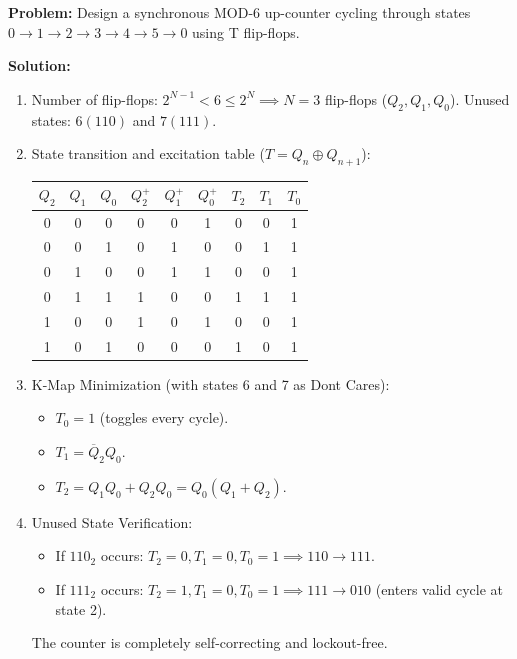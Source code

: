 \begin{examplebox}
\textbf{Problem:} Design a synchronous MOD-6 up-counter cycling through states $0 \to 1 \to 2 \to 3 \to 4 \to 5 \to 0$ using T flip-flops.

\textbf{Solution:}
\begin{enumerate}
    \item Number of flip-flops: $2^{N-1} < 6 \le 2^N \implies N = 3$ flip-flops ($Q_2, Q_1, Q_0$). Unused states: $6 (110)$ and $7 (111)$.
    \item State transition and excitation table ($T = Q_n \oplus Q_{n+1}$):
    \begin{center}
    \begin{tabular}{c c c | c c c | c c c}
    \toprule
    $Q_2$ & $Q_1$ & $Q_0$ & $Q_2^+$ & $Q_1^+$ & $Q_0^+$ & $T_2$ & $T_1$ & $T_0$ \\
    \midrule
    0 & 0 & 0 & 0 & 0 & 1 & 0 & 0 & 1 \\
    0 & 0 & 1 & 0 & 1 & 0 & 0 & 1 & 1 \\
    0 & 1 & 0 & 0 & 1 & 1 & 0 & 0 & 1 \\
    0 & 1 & 1 & 1 & 0 & 0 & 1 & 1 & 1 \\
    1 & 0 & 0 & 1 & 0 & 1 & 0 & 0 & 1 \\
    1 & 0 & 1 & 0 & 0 & 0 & 1 & 0 & 1 \\
    \bottomrule
    \end{tabular}
    \end{center}
    \item K-Map Minimization (with states 6 and 7 as Don\textquotesingle t Cares):
    \begin{itemize}
        \item $T_0 = 1$ (toggles every cycle).
        \item $T_1 = \overline{Q}_2 Q_0$.
        \item $T_2 = Q_1 Q_0 + Q_2 Q_0 = Q_0 (Q_1 + Q_2)$.
    \end{itemize}
    \item Unused State Verification:
    \begin{itemize}
        \item If $110_2$ occurs: $T_2 = 0, T_1 = 0, T_0 = 1 \implies 110 \to 111$.
        \item If $111_2$ occurs: $T_2 = 1, T_1 = 0, T_0 = 1 \implies 111 \to 010$ (enters valid cycle at state 2).
    \end{itemize}
    The counter is completely self-correcting and lockout-free.
\end{enumerate}
\end{examplebox}

